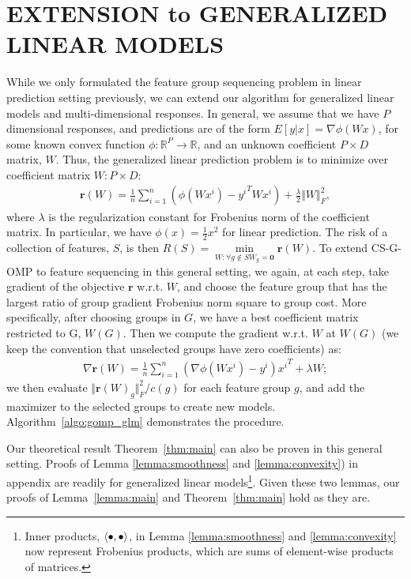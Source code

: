 \section{EXTENSION to GENERALIZED LINEAR MODELS}
\label{sec:extension}
While we only formulated the feature group sequencing problem in linear prediction setting previously, we can extend our algorithm for generalized linear models\cite{glm} and multi-dimensional responses. In general, we assume that we have $P$ dimensional responses, and predictions are of the form $E[y | x ] = \nabla \phi( W x)$, for some known convex function $\phi : \mathbb{R}^P \rightarrow \mathbb{R}$, and an unknown coefficient $P\times D$ matrix, $W$. Thus, the generalized linear
prediction problem is to minimize over coefficient matrix $W: P\times D$:
\begin{align}
	\textbf{r}(W) = \frac{1}{n} \sum _{i=1}^n (\phi(Wx^i) - {y^i}^TWx^i) 
		+ \frac{\lambda}{2} \Vert W\Vert^2_F,
		\label{eq:glm_loss}
\end{align}
where $\lambda$ is the regularization constant for Frobenius norm of the coefficient 
matrix. In particular, we have $\phi(x) = \frac{1}{2}x^2$ for linear prediction. 
The risk of a collection of features, $S$, is then 
\mbox{$R(S) = \underset{W : \forall g \notin S  W_g = \textbf{0} }{\min} \textbf{r}(W)$}. 
To extend CS-G-OMP to feature sequencing in this general setting, we again, at each step,
take gradient of the objective $\textbf{r}$ w.r.t. $W$, and choose the feature group that has the largest ratio of group gradient Frobenius norm square to group cost. More specifically, after choosing groups in $G$, we have a best coefficient matrix restricted to G, $W(G)$. Then we compute the gradient w.r.t. $W$ at $W(G)$ (we keep the convention that unselected groups have zero coefficients) as:
\begin{align}
	\nabla \textbf{r}(W) = \frac{1}{n} \sum _{i=1}^n (\nabla \phi(Wx^i) - y^i){x^i}^T + \lambda W;
	\label{eq:glm_gradient}
\end{align}
we then evaluate $\Vert \textbf{r}(W)_g \Vert_F^2 / c(g)$ for each feature group $g$, and add the maximizer to the selected groups to create new models. 
Algorithm~\ref{algo:gomp_glm} demonstrates the procedure. 

Our theoretical result Theorem~\ref{thm:main} can also be proven in this general setting. 
Proofs of Lemma \ref{lemma:smoothness} and \ref{lemma:convexity}) in appendix are readily for generalized linear models\footnote{Inner products, $\langle \bullet, \bullet \rangle$, in Lemma \ref{lemma:smoothness} and \ref{lemma:convexity} now represent Frobenius products, which are sums of element-wise products of matrices.}. Given these two lemmas, our proofs of Lemma~\ref{lemma:main}
and Theorem~\ref{thm:main} hold as they are. 


